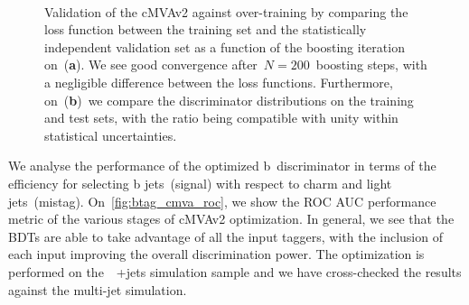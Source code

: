 \begin{figure}
\begin{centering}
 \\
\caption[The cMVAv2 BDT loss as a function of boosting iteration]{Validation of the cMVAv2 against over-training by comparing the loss function between the training set and the statistically independent validation set as a function of the boosting iteration on~(\textbf{a}). We see good convergence after~$N=200$~boosting steps, with a negligible difference between the loss functions. Furthermore, on~(\textbf{b})~we compare the discriminator distributions on the training and test sets, with the ratio being compatible with unity within statistical uncertainties.}
\label{fig:btag_loss}
\end{centering}
\end{figure}

We analyse the performance of the optimized b~discriminator in terms of the efficiency for selecting b jets~(signal) with respect to charm and light jets~(mistag). On~\cref{fig:btag_cmva_roc}, we show the ROC AUC performance metric of the various stages of cMVAv2 optimization. In general, we see that the BDTs are able to take advantage of all the input taggers, with the inclusion of each input improving the overall discrimination power. The optimization is performed on the~\ttbar~+jets simulation sample and we have cross-checked the results against the multi-jet simulation.

